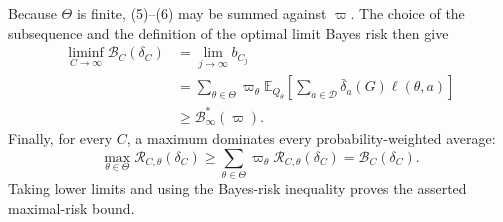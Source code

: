 Because \(\Theta\) is finite, (5)--(6) may be summed against \(\varpi\).  The choice of the subsequence and the definition of the optimal limit Bayes risk then give
\[
 \begin{aligned}
 \liminf_{C\to\infty}\mathcal B_C(\delta_C)
 &=\lim_{j\to\infty}b_{C_j}\\
 &=\sum_{\theta\in\Theta}\varpi_\theta
   \mathbb E_{Q_\theta}\!\left[
     \sum_{a\in\mathcal D}\bar\delta_a(G)\ell(\theta,a)
   \right]\\
 &\geq \mathcal B_\infty^*(\varpi).
 \end{aligned}
\]
Finally, for every \(C\), a maximum dominates every probability-weighted average:
\[
 \max_{\theta\in\Theta}\mathcal R_{C,\theta}(\delta_C)
 \geq
 \sum_{\theta\in\Theta}\varpi_\theta
 \mathcal R_{C,\theta}(\delta_C)
 =\mathcal B_C(\delta_C).
\]
Taking lower limits and using the Bayes-risk inequality proves the asserted maximal-risk bound.